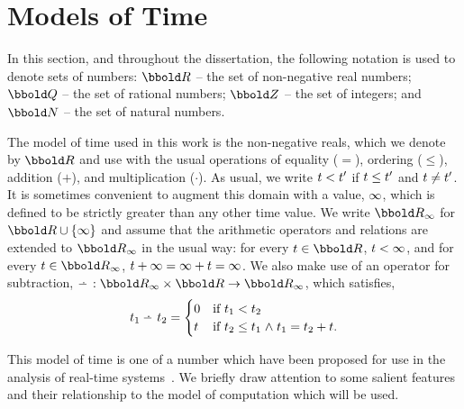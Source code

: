 \section{Models of Time \label{sec:msctime}}
\begin{notation}
In this section, and throughout the dissertation, the following notation is
used to denote sets of numbers: $\Time$ -- the set of non-negative real
numbers; $\rat$ -- the set of rational numbers; $\num$ -- the set of integers;
and $\nat$ -- the set of natural numbers.
\end{notation}
The model of time used in this work is the non-negative reals, which
we denote by $\Time$ and use with the usual operations of equality
($=$), ordering ($\leq$), addition ($+$), and multiplication
($\cdot$). As usual, we write ${t} < {t}'$ if ${t} \leq {t}'$ and ${t}
\neq {t}'$.  It is sometimes convenient to augment this domain with a
value, $\infty$, which is defined to be strictly greater than any
other time value.  We write $\TimeInf$ for $\Time
\cup \{\infinity\}$ and assume that the arithmetic operators and relations are
extended to $\TimeInf$ in the usual way: for every $\ti \in \Time$, ${t} <
\infty$, and for every $\ti \in \TimeInf$, ${t} + \infty = \infty +
{t} = \infty$. We also make use of an operator for subtraction, 
$\nmin : \TimeInf \cross \Time
\fun \TimeInf$, which satisfies,
\[
\ti_1 \nmin \ti_2 =
\begin{cases}
0 & \text{if } \ti_1 < \ti_2 \\
\ti & \text{if } \ti_2 \leq \ti_1 \land \ti_1 = \ti_2 + \ti.
\end{cases}
\]

This model of time is one of a number which have been proposed for use
in the analysis of real-time systems~\cite{ah:91,jos:91,koy:91,nic:92}.  We
briefly draw attention to some salient features and their relationship
to the model of computation which will be used. 

